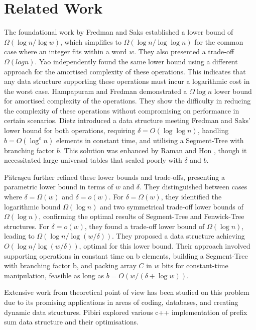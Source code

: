 \section{Related Work}
The foundational work by Fredman and Saks \cite{FREDMAN1993424} established a lower bound of $\Omega(\log n / \log w)$, which simplifies to $\Omega(\log n / \log \log n)$ for the common case where an integer fits within a word $w$. They also presented a trade-off $ \Omega(log n)$. Yao \cite{Yao_1985} independently found the same lower bound using a different approach for the amortised complexity of these operations. This indicates that any data structure supporting these operations must incur a logarithmic cost in the worst case. Hampapuram and Fredman \cite{Hampapuram_1998} demonstrated a $\Omega \log n$ lower bound for amortised complexity of the operations. They show the difficulty in reducing the complexity of these operations without compromising on performance in certain scenarios. Dietz \cite{Dietz_1989} introduced a data structure meeting Fredman and Saks' lower bound for both operations, requiring $\delta = O(\log \log n)$, handling $b = O(\log^{\varepsilon} n)$ elements in constant time, and utilising a Segment-Tree with branching factor $b$. This solution was enhanced by Raman \cite{Raman_2001} and Hon \cite{Hon_2011}, though it necessitated large universal tables that scaled poorly with $\delta$ and $b$.\par
Pătraşcu \cite{Patrascu_2006} further refined these lower bounds and trade-offs, presenting a parametric lower bound in terms of $w$ and $\delta$. They distinguished between cases where $\delta = \Omega(w)$ and $\delta = o(w)$. For $\delta = \Omega(w)$, they identified the logarithmic bound $\Omega(\log n)$ and two symmetrical trade-off lower bounds of $\Omega(\log n)$, confirming the optimal results of Segment-Tree and Fenwick-Tree structures. For $\delta = o(w)$, they found a trade-off lower bound of $\Omega(\log n)$, leading to $\Omega(\log n / \log(w/\delta))$. They proposed a data structure achieving $O(\log n / \log(w/\delta))$, optimal for this lower bound. Their approach involved supporting operations in constant time on b elements, building a Segment-Tree with branching factor b, and packing array $C$ in $w$ bits for constant-time manipulation, feasible as long as $b = O(w/(\delta + \log w))$.\par
Extensive work from theoretical point of view has been studied on this problem \cite{Bille_2017, Bille_2018, Chan_2010, Fredman_1982, Hampapuram_1998, Hon_2011, Patrascu_2006, Yao_1985}  due to its promising applications in areas of coding, databases, and creating dynamic data structures. Pibiri \cite{Pibiri_2020}  explored various c++ implementation of prefix sum data structure and their optimisations.
\FloatBarrier
